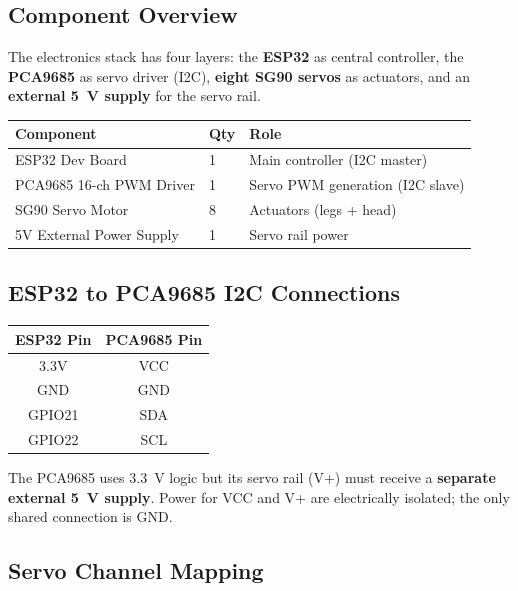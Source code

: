 \documentclass[12pt, a4paper]{article}
\begin{document}
\subsection{Component Overview}

The electronics stack has four layers: the \textbf{ESP32} as central controller,
the \textbf{PCA9685} as servo driver (I2C), \textbf{eight SG90 servos} as
actuators, and an \textbf{external 5~V supply} for the servo rail.

\begin{center}
\begin{tabular}{|l|l|l|}
\hline
\textbf{Component} & \textbf{Qty} & \textbf{Role} \\
\hline
ESP32 Dev Board & 1 & Main controller (I2C master) \\
PCA9685 16-ch PWM Driver & 1 & Servo PWM generation (I2C slave) \\
SG90 Servo Motor & 8 & Actuators (legs + head) \\
5V External Power Supply & 1 & Servo rail power \\
\hline
\end{tabular}
\end{center}

\subsection{ESP32 to PCA9685 I2C Connections}

\begin{center}
\begin{tabular}{|c|c|}
\hline
\textbf{ESP32 Pin} & \textbf{PCA9685 Pin} \\
\hline
3.3V   & VCC \\
GND    & GND \\
GPIO21 & SDA \\
GPIO22 & SCL \\
\hline
\end{tabular}
\end{center}

The PCA9685 uses 3.3~V logic but its servo rail (V+) must receive a
\textbf{separate external 5~V supply}. Power for VCC and V+ are electrically
isolated; the only shared connection is GND.

\subsection{Servo Channel Mapping}
\end{document}
